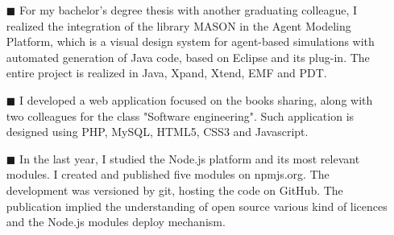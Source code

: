 \documentclass[helvetica,english,logo,notitle,totpages,utf8]{europecv2013}
\begin{document}
\begin{europecv}
{{\begin{itemize}
	\item[\color{curious-blue}\tiny$\blacksquare$] For my bachelor’s degree thesis with another graduating colleague, I realized the integration
	of the library MASON in the Agent Modeling Platform, which is a visual design system for agent-based simulations with automated generation of Java code, based on Eclipse and its plug-in. The entire project is realized in Java, Xpand, Xtend, EMF and PDT.
	\item[\color{curious-blue}\tiny$\blacksquare$] I developed a web application focused on the books sharing, along with two colleagues for the class "Software engineering". Such application is designed using PHP, MySQL, HTML5, CSS3 and Javascript.
	\item[\color{curious-blue}\tiny$\blacksquare$] In the last year, I studied the Node.js platform and its most relevant modules. I created and published five modules on npmjs.org. The development was versioned by git, hosting the code on GitHub. The publication implied the understanding of open source various kind of licences and the Node.js modules deploy mechanism.
\end{itemize}
}
}






\end{europecv}
\end{document}
